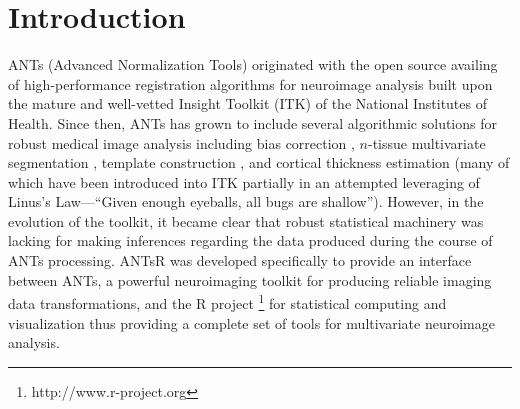 \documentclass[final,5p,times,twocolumn]{elsarticle}
\begin{document}
%
%
\newpage







%
%
%

\section{Introduction}

ANTs (Advanced Normalization Tools) originated with the open source availing
of high-performance registration algorithms for neuroimage analysis
\citep{avants2008a} built upon the mature and well-vetted Insight Toolkit (ITK)
of the National Institutes of Health.  Since then, ANTs has grown to include 
several algorithmic solutions for robust medical image analysis including bias 
correction \citep{tustison2010}, $n$-tissue multivariate segmentation 
\citep{avants2011}, template construction \citep{avants2010}, and cortical 
thickness estimation \citep{das2009} (many of which have been
introduced into ITK partially in an attempted leveraging of Linus's Law---``Given enough eyeballs, all bugs are shallow'').  
However, in the evolution of the toolkit, it became clear 
that robust statistical machinery was lacking for making inferences regarding
the data produced during the course of ANTs processing.  ANTsR was developed
specifically to provide an interface between ANTs, a 
powerful neuroimaging toolkit for producing reliable imaging data 
transformations, and the R project%
\footnote{
http://www.r-project.org
}
for statistical computing and visualization thus providing a complete
set of tools for multivariate neuroimage analysis. 
\end{document}
